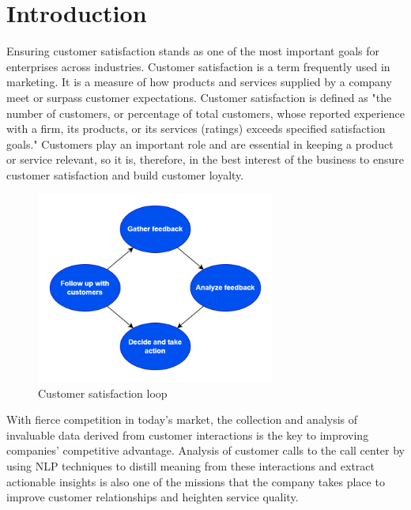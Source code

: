 \chapter{Introduction}

\startcontents[chapters]


 Ensuring customer satisfaction stands as one of the most important goals for enterprises across industries. Customer satisfaction is a term frequently used in marketing. It is a measure of how products and services supplied by a company meet or surpass customer expectations. Customer satisfaction is defined as "the number of customers, or percentage of total customers, whose reported experience with a firm, its products, or its services (ratings) exceeds specified satisfaction goals."\cite{cus_sas} Customers play an important role and are essential in keeping a product or service relevant, so it is, therefore, in the best interest of the business to ensure customer satisfaction and build customer loyalty. 

\begin{figure}[H]
    \centering
    \includegraphics[width=0.7\textwidth]{images/customer-sastifaction.drawio.png}
    \caption{Customer satisfaction loop}
    \label{fig:cus_satis}
\end{figure}

With fierce competition in today's market, the collection and analysis of invaluable data derived from customer interactions is the key to improving companies' competitive advantage. Analysis of customer calls to the call center by using NLP techniques to distill meaning from these interactions and extract actionable insights is also one of the missions that the company takes place to improve customer relationships and heighten service quality.


